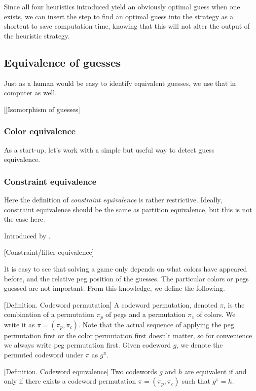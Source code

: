 Since all four heuristics introduced yield an obviously optimal guess when one exists, we can insert the step to find an optimal guess into the strategy as a shortcut to save computation time, knowing that this will not alter the output of the heuristic strategy.

\subsection{Equivalence of guesses}

Just as a human would be easy to identify equivalent guesses, we use that in computer as well.

[]Isomorphism of guesses]

\subsubsection{Color equivalence}

As a start-up, let's work with a simple but useful way to detect guess equivalence.

\subsubsection{Constraint equivalence}

Here the definition of \emph{constraint equivalence} is rather restrictive. Ideally, constraint equivalence should be the same as partition equivalence, but this is not the case here.

Introduced by \cite{neuwirth81,koyama93}. 

[Constraint/filter equivalence]

It is easy to see that solving a game only depends on what colors have appeared before, and the relative peg position of the guesses. The particular colors or pegs guessed are not important. From this knowledge, we define the following.

[Definition. Codeword permutation] A codeword permutation, denoted $\pi$, is the combination of a permutation $\pi_p$ of pegs and a permutation $\pi_c$ of colors. We write it as $\pi=(\pi_p,\pi_c)$. Note that the actual sequence of applying the peg permutation first or the color permutation first doesn't matter, so for convenience we always write peg permutation first. Given codeword $g$, we denote the permuted codeword under $\pi$ as $g^\pi$.

[Definition. Codeword equivalence] Two codewords $g$ and $h$ are equivalent if and only if there exists a codeword permutation $\pi=(\pi_p,\pi_c)$ such that $g^\pi = h$.


